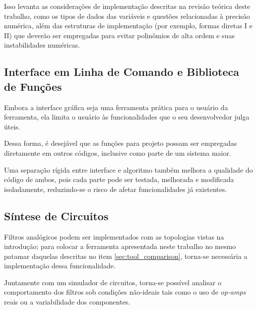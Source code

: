 Isso levanta as considerações de implementação descritas na revisão teórica deste trabalho, como os tipos de dados das variáveis e questões relacionadas à precisão numérica, além das estruturas de implementação (por exemplo, formas diretas I e II) que deverão ser empregadas para evitar polinômios de alta ordem e suas instabilidades numéricas.

\subsection{Interface em Linha de Comando e Biblioteca de Funções}
Embora a interface gráfica seja uma ferramenta prática para o usuário da ferramenta, ela limita o usuário às funcionalidades que o seu desenvolvedor julga úteis. 

Dessa forma, é desejável que as funções para projeto possam ser empregadas diretamente em outros códigos, inclusive como parte de um sistema maior.

Uma separação rígida entre interface e algoritmo também melhora a qualidade do código de ambos, pois cada parte pode ser testada, melhorada e modificada isoladamente, reduzindo-se o risco de afetar funcionalidades já existentes.

\subsection{Síntese de Circuitos}
Filtros analógicos podem ser implementados com as topologias vistas na introdução; para colocar a ferramenta apresentada neste trabalho no mesmo patamar daquelas descritas no item \ref{sec:tool_comparison}, torna-se necessária a implementação dessa funcionalidade.

Juntamente com um simulador de circuitos, torna-se possível analisar o comportamento dos filtros sob condições não-ideais tais como o uso de \textit{op-amps} reais ou a variabilidade dos componentes.